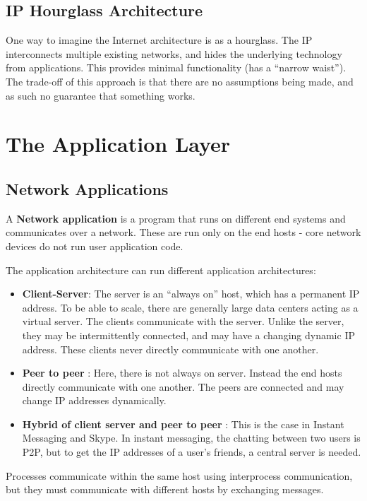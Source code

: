 \documentclass[12pt,letterpaper]{amsbook}
\theoremstyle{definition}
\begin{document}
\section{IP Hourglass Architecture}

One way to imagine the Internet architecture is as a hourglass. The IP interconnects multiple existing networks, and hides the underlying technology from applications. This provides minimal functionality (has a ``narrow waist''). The trade-off of this approach is that there are no assumptions being made, and as such no guarantee that something works.

\chapter{The Application Layer}

\section{Network Applications}

A \textbf{Network application} is a program that runs on different end systems and communicates over a network. These are run only on the end hosts - core network devices do not run user application code.

The application architecture can run different application architectures:

\begin{itemize}
  \item \textbf{Client-Server}: The server is an ``always on'' host, which has a permanent IP address. To be able to scale, there are generally large data centers acting as a virtual server. The clients communicate with the server. Unlike the server, they may be intermittently connected, and may have a changing dynamic IP address. These clients never directly communicate with one another.
  \item \textbf{Peer to peer} : Here, there is not always on server. Instead the end hosts directly communicate with one another. The peers are connected and may change IP addresses dynamically.
  \item \textbf{Hybrid of client server and peer to peer} : This is the case in Instant Messaging and Skype. In instant messaging, the chatting between two users is P2P, but to get the IP addresses of a user's friends, a central server is needed.
\end{itemize}

Processes communicate within the same host using interprocess communication, but they must communicate with different hosts by exchanging messages.
\end{document}
